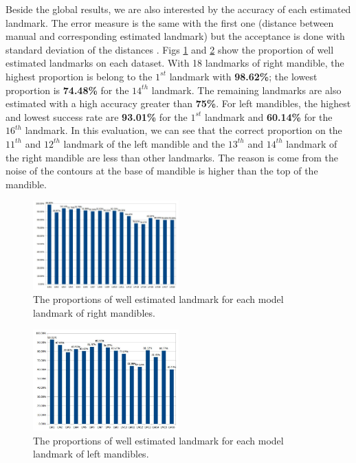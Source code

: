\documentclass{gretsi}
\begin{document}
Beside the global results, we are also interested by the accuracy of each estimated landmark. The error measure is the same with the first one (distance between manual and corresponding estimated landmark) but the acceptance is done with standard deviation of the distances \cite{bland1996statistics}. Figs \ref{fig7} and \ref{fig8} show the proportion of well estimated landmarks on each dataset. With 18 landmarks of right mandible, the highest proportion is belong to the $1^{st}$ landmark with \textbf{98.62\%}; the lowest proportion is \textbf{74.48\%} for the $14^{th}$ landmark. The remaining landmarks are also estimated with a high accuracy greater than \textbf{75\%}. For left mandibles, the highest and lowest success rate are \textbf{93.01\%} for the $1^{st}$ landmark and \textbf{60.14\%} for the $16^{th}$ landmark. In this evaluation, we can see that the correct proportion on the $11^{th}$ and $12^{th}$ landmark of the left mandible and the $13^{th}$ and $14^{th}$ landmark of the right mandible are less than other landmarks. The reason is come from the noise of the contours at the base of mandible is higher than the top of the mandible.
\begin{figure}[htb]
    \centering
    \includegraphics[width=0.5\textwidth]{./images/md_chartlms}
    \caption{The proportions of well estimated landmark for each model landmark of right mandibles.}
    \label{fig7}
\end{figure}
\begin{figure}[htb]
    \centering
    \includegraphics[width=0.5\textwidth]{./images/mg_chartlms}
    \caption{The proportions of well estimated landmark for each model landmark of left mandibles.}
    \label{fig8}
\end{figure}
\end{document}
